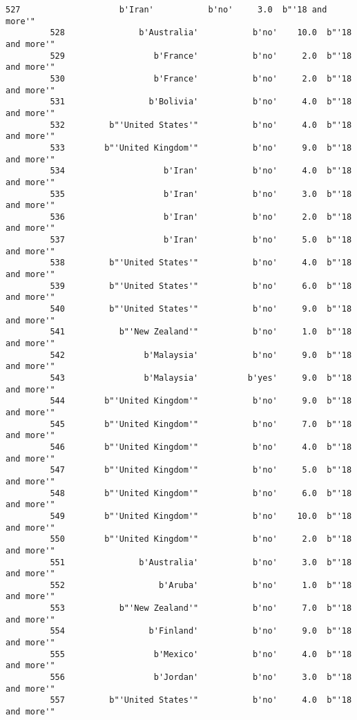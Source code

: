 \documentclass[11pt]{article}
\begin{document}
\begin{Verbatim}[commandchars=\\\{\}]
         527                    b'Iran'           b'no'     3.0  b"'18 and more'"   
         528               b'Australia'           b'no'    10.0  b"'18 and more'"   
         529                  b'France'           b'no'     2.0  b"'18 and more'"   
         530                  b'France'           b'no'     2.0  b"'18 and more'"   
         531                 b'Bolivia'           b'no'     4.0  b"'18 and more'"   
         532         b"'United States'"           b'no'     4.0  b"'18 and more'"   
         533        b"'United Kingdom'"           b'no'     9.0  b"'18 and more'"   
         534                    b'Iran'           b'no'     4.0  b"'18 and more'"   
         535                    b'Iran'           b'no'     3.0  b"'18 and more'"   
         536                    b'Iran'           b'no'     2.0  b"'18 and more'"   
         537                    b'Iran'           b'no'     5.0  b"'18 and more'"   
         538         b"'United States'"           b'no'     4.0  b"'18 and more'"   
         539         b"'United States'"           b'no'     6.0  b"'18 and more'"   
         540         b"'United States'"           b'no'     9.0  b"'18 and more'"   
         541           b"'New Zealand'"           b'no'     1.0  b"'18 and more'"   
         542                b'Malaysia'           b'no'     9.0  b"'18 and more'"   
         543                b'Malaysia'          b'yes'     9.0  b"'18 and more'"   
         544        b"'United Kingdom'"           b'no'     9.0  b"'18 and more'"   
         545        b"'United Kingdom'"           b'no'     7.0  b"'18 and more'"   
         546        b"'United Kingdom'"           b'no'     4.0  b"'18 and more'"   
         547        b"'United Kingdom'"           b'no'     5.0  b"'18 and more'"   
         548        b"'United Kingdom'"           b'no'     6.0  b"'18 and more'"   
         549        b"'United Kingdom'"           b'no'    10.0  b"'18 and more'"   
         550        b"'United Kingdom'"           b'no'     2.0  b"'18 and more'"   
         551               b'Australia'           b'no'     3.0  b"'18 and more'"   
         552                   b'Aruba'           b'no'     1.0  b"'18 and more'"   
         553           b"'New Zealand'"           b'no'     7.0  b"'18 and more'"   
         554                 b'Finland'           b'no'     9.0  b"'18 and more'"   
         555                  b'Mexico'           b'no'     4.0  b"'18 and more'"   
         556                  b'Jordan'           b'no'     3.0  b"'18 and more'"   
         557         b"'United States'"           b'no'     4.0  b"'18 and more'"   

\end{Verbatim}
\end{document}
